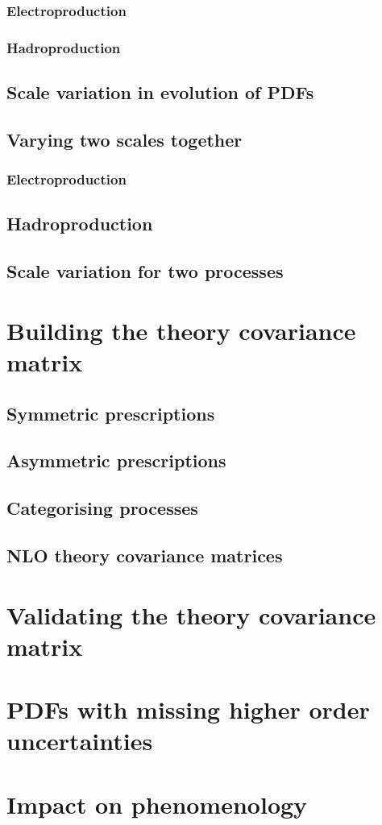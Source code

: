 \subsubsection{Electroproduction}
\subsubsection{Hadroproduction}

\subsection{Scale variation in evolution of PDFs}
\subsection{Varying two scales together}
\subsubsection{Electroproduction}
\subsection{Hadroproduction}

\subsection{Scale variation for two processes}

\section{Building the theory covariance matrix}
\label{sec:prescrip}
\subsection{Symmetric prescriptions}
\subsection{Asymmetric prescriptions}
\subsection{Categorising processes}
\subsection{NLO theory covariance matrices}

\section{Validating the theory covariance matrix}
\label{sec:valid}

\section{PDFs with missing higher order uncertainties}
\label{sec:pdfs}

\section{Impact on phenomenology}
\label{sec:mhoupheno}
